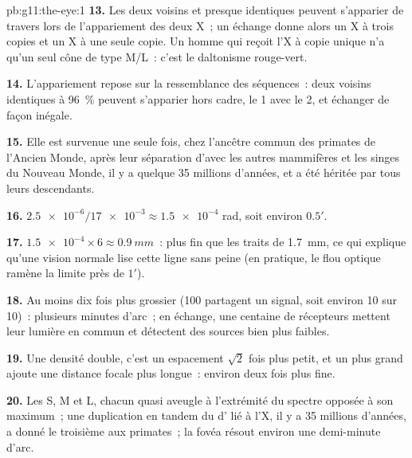 \begin{solution}{pb:g11:the-eye:1}
\textbf{13.} Les deux  voisins et presque identiques peuvent
s'apparier de travers lors de l'appariement des deux  X~; un
échange donne alors un X à trois copies et un X à une seule copie. Un
homme qui reçoit l'X à copie unique n'a qu'un seul cône de type M/L~:
c'est le daltonisme rouge-vert.

\textbf{14.} L'appariement repose sur la ressemblance des séquences~:
deux  voisins identiques à 96~\% peuvent s'apparier hors cadre, le
 1 avec le  2, et échanger de façon inégale.

\textbf{15.} Elle est survenue une seule fois, chez l'ancêtre commun
des primates de l'Ancien Monde, après leur séparation d'avec les autres
mammifères et les singes du Nouveau Monde, il y a quelque 35 millions
d'années, et a été héritée par tous leurs descendants.

\textbf{16.} $\num{2.5e-6}/\num{17e-3} \approx \num{1.5e-4}$ rad, soit
environ $0.5'$.

\textbf{17.} $\num{1.5e-4} \times 6 \approx \qty{0.9}{mm}$~: plus fin
que les traits de \qty{1.7}{mm}, ce qui explique qu'une vision normale
lise cette ligne sans peine (en pratique, le flou optique ramène la
limite près de $1'$).

\textbf{18.} Au moins dix fois plus grossier (100  partagent
un signal, soit environ 10 sur 10)~: plusieurs minutes d'arc~; en
échange, une centaine de récepteurs mettent leur lumière en commun et
détectent des sources bien plus faibles.

\textbf{19.} Une densité double, c'est un espacement $\sqrt{2}$ fois
plus petit, et un  plus grand ajoute une distance focale plus
longue~: environ deux fois plus fine.

\textbf{20.} Les  S, M et L, chacun quasi aveugle à l'extrémité du
spectre opposée à son maximum~; une duplication en tandem du 
d' lié à l'X, il y a 35 millions d'années, a donné le troisième
aux primates~; la fovéa résout environ une demi-minute d'arc.
\end{solution}
